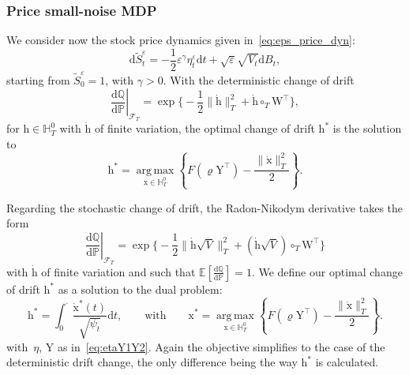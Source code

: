 \documentclass{amsart}[11pt]
\numberwithin{equation}{section}
\numberwithin{theorem}{subsection}
\numberwithin{proposition}{subsection}
\numberwithin{definition}{subsection}
\numberwithin{lemma}{subsection}
\newtheorem*{remark}{Remark}
\numberwithin{assumption}{subsection}
\newcommand{\Ff}{\mathcal{F}}
\newcommand{\HH}{\mathbb{H}}
\newcommand{\PP}{\mathbb{P}}
\newcommand{\QQ}{\mathbb{Q}}
\newcommand{\EE}{\mathbb{E}}
\newcommand{\cT}{\circ_{T}}
\newcommand{\Wf}{\boldsymbol{\mathrm{W}}}
\newcommand{\Yf}{\boldsymbol{\mathrm{Y}}}
\newcommand{\vrho}{\boldsymbol{\mathrm{\varrho}}}
\newcommand{\brho}{\overline{\rho}}
\newcommand{\D}{\mathrm{d}}
\newcommand{\eps}{\varepsilon}
\newcommand{\hh}{\boldsymbol{\mathrm{h}}}
\newcommand{\xx}{\boldsymbol{\mathrm{x}}}
\DeclareMathOperator*{\argmax}{arg\,max}
\begin{document}
\subsubsection{Price small-noise MDP}
We consider now the stock price dynamics given in~\eqref{eq:eps_price_dyn}:
$$
\D\widetilde{S}^\eps_t = -\frac{1}{2}\eps^\gamma\eta_{t}^\eps\D t + \sqrt{\eps}\sqrt{V_t}\D B_t,
$$
starting from $\widetilde{S}_0^\eps = 1$, with $\gamma >0$.
With the  deterministic change of drift
$$
\left.\frac{\D\QQ}{\D\PP}\right\rvert_{\Ff_T}
= \exp\Big\{-\frac{1}{2}\|\dot{\hh}\|_{T}^2 + \dot{\hh}\cT \Wf^\top\Big\},
$$
for $\hh \in \HH_T^0$ with $\dot{\hh}$ of finite variation,
the optimal change of drift $\hh^{*}$ is the solution to
\begin{equation}\label{eq:optidetdrift-price}
\hh^{*} = \argmax\limits_{\xx \in \HH_T^0} 
\left\{F(\vrho \Yf^\top)- \frac{\|\dot{\xx}\|_{T}^2}{2}\right\}.
\end{equation}

Regarding the stochastic change of drift,
the Radon-Nikodym derivative takes the form
\[
\left.\frac{\D\QQ}{\D\PP}\right\rvert_{\Ff_T} = \exp\Big\{-\frac{1}{2}\|\dot{\hh}\sqrt{V}\|_{T}^2
 + (\dot{\hh}\sqrt{V})\cT \Wf^\top\Big\}
\]
with $\dot{\hh}$ of finite variation and such that $\EE\left[\frac{\D\QQ}{\D\PP}\right]=1$.
We define our optimal change of drift $\hh^{*}$ as a solution to the dual problem:
$$
\hh^{*} = \int_{0}^{\cdot}\frac{\dot{\xx}^{*}(t)}{\sqrt{\psi_t}} \D t,
\qquad\text{with}\qquad 
\xx^{*} = \argmax\limits_{\xx \in \HH_T^0} \left\{F(\vrho \Yf^\top)
- \frac{\|\dot{\xx}\|^2_T}{2}\right\}.
$$
with~$\eta$, $\Yf$ as in~\eqref{eq:etaY1Y2}. Again the objective simplifies to the case of the deterministic drift change, the only difference being the way $\hh^{*}$ is calculated.
\end{document}
